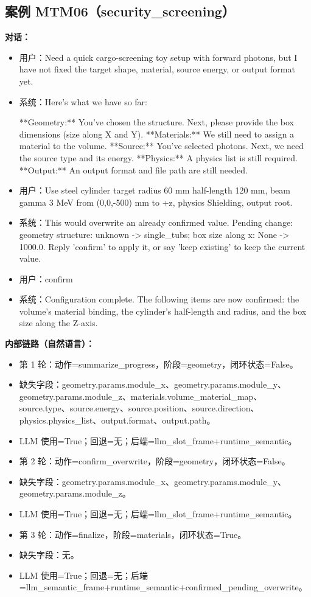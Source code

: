 \documentclass[11pt]{ctexart}
\begin{document}
\subsection{案例 MTM06（security\_screening）}
\textbf{对话：}
\begin{itemize}
\item 用户：Need a quick cargo-screening toy setup with forward photons, but I have not fixed the target shape, material, source energy, or output format yet.
\item 系统：Here's what we have so far:

**Geometry:** You've chosen the structure. Next, please provide the box dimensions (size along X and Y).
**Materials:** We still need to assign a material to the volume.
**Source:** You've selected photons. Next, we need the source type and its energy.
**Physics:** A physics list is still required.
**Output:** An output format and file path are still needed.
\item 用户：Use steel cylinder target radius 60 mm half-length 120 mm, beam gamma 3 MeV from (0,0,-500) mm to +z, physics Shielding, output root.
\item 系统：This would overwrite an already confirmed value. Pending change: geometry structure: unknown -> single\_tubs; box size along x: None -> 1000.0. Reply 'confirm' to apply it, or say 'keep existing' to keep the current value.
\item 用户：confirm
\item 系统：Configuration complete. The following items are now confirmed: the volume's material binding, the cylinder's half-length and radius, and the box size along the Z-axis.
\end{itemize}
\textbf{内部链路（自然语言）：}
\begin{itemize}
\item 第 1 轮：动作=summarize\_progress，阶段=geometry，闭环状态=False。
\item 缺失字段：geometry.params.module\_x、geometry.params.module\_y、geometry.params.module\_z、materials.volume\_material\_map、source.type、source.energy、source.position、source.direction、physics.physics\_list、output.format、output.path。
\item LLM 使用=True；回退=无；后端=llm\_slot\_frame+runtime\_semantic。
\item 第 2 轮：动作=confirm\_overwrite，阶段=geometry，闭环状态=False。
\item 缺失字段：geometry.params.module\_x、geometry.params.module\_y、geometry.params.module\_z。
\item LLM 使用=True；回退=无；后端=llm\_slot\_frame+runtime\_semantic。
\item 第 3 轮：动作=finalize，阶段=materials，闭环状态=True。
\item 缺失字段：无。
\item LLM 使用=True；回退=无；后端=llm\_semantic\_frame+runtime\_semantic+confirmed\_pending\_overwrite。
\end{itemize}
\end{document}

